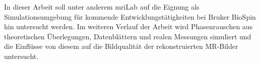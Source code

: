 In dieser Arbeit soll unter anderem \gls{mr}iLab auf die Eignung als Simulationsumgebung für kommende Entwicklungstätigkeiten bei Bruker BioSpin hin untersucht werden. Im weiteren Verlauf der Arbeit wird Phasenrauschen aus theoretischen Überlegungen, Datenblättern und realen Messungen simuliert und die Einflüsse von diesem auf die Bildqualität der rekonstruierten MR-Bilder untersucht.


